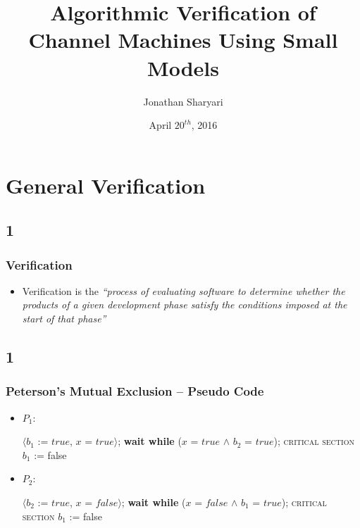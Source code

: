 \documentclass[handout]{beamer}
\title[] %
{Algorithmic Verification of Channel Machines Using Small Models}
\author[J, Sharyari | \emph{sharyari@gmail.com}] {Jonathan Sharyari}
\date[2016-04-20] %
{April $20^{th}$, 2016}
\institute[Dept. of Information Technology] %
{
  Department of Information Technology\\
  Uppsala University \\ \vspace{10pt}
  Supervisor: Parosh Abdulla \\
  Reviewer: Mohamed Faouzi Atig
}
\begin{document}
\begin{frame}[plain]
  \titlepage
\end{frame}

\begin{frame}
  \tableofcontents

\end{frame}

\section{General Verification}
\subsection*{1}
\begin{frame}
  \frametitle{Verification}
  \begin{itemize}
  \item
    Verification is the \emph{``process of evaluating software to determine whether the products of a given development phase satisfy the conditions imposed at the start of that phase''}
  \end{itemize}
\end{frame}

\subsection*{1}
\begin{frame}
  \frametitle{Peterson's Mutual Exclusion -- Pseudo Code}
  \begin{itemize}
  \item
$P_1$:
  \begin{algorithmic}
    \small
    \State $\langle b_1$ := $true$, $x$ = $true\rangle$;
    \State \textbf{wait while} ($x$ = $true$ $\wedge$ $b_2$ = $true$);
    \State \textsc{critical section}
    \State $b_1$ := false
    \EndWhile
  \end{algorithmic}
  \item
$P_2$:
  \begin{algorithmic}
    \small
    \State $\langle b_2$ := $true$, $x$ = $false\rangle$;
    \State \textbf{wait while} ($x$ = $false$ $\wedge$ $b_1$ = $true$);
    \State \textsc{critical section}
    \State $b_1$ := false
    \EndWhile
  \end{algorithmic}
\end{itemize}


\end{frame}
\end{document}
